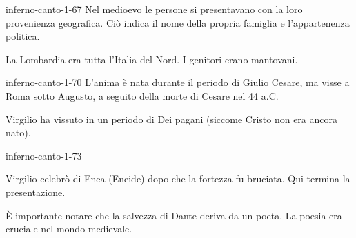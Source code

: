 \documentclass[preview]{standalone}
\begin{document}
\begin{snippet}{inferno-canto-1-67}
    Nel medioevo le persone si presentavano con la loro provenienza geografica.
    Ciò indica il nome della propria famiglia e l'appartenenza politica.
    
    La Lombardia era tutta l'Italia del Nord.
    I genitori erano mantovani.
\end{snippet}

\begin{snippet}{inferno-canto-1-70}
    L'anima è nata durante il periodo di Giulio Cesare, ma visse
    a Roma sotto Augusto, a seguito della morte di Cesare nel 44 a.C.
    
    Virgilio ha vissuto in un periodo di Dei pagani (siccome Cristo non era ancora nato).
\end{snippet}

\begin{snippet}{inferno-canto-1-73}

    Virgilio celebrò di Enea (Eneide) dopo che la fortezza fu bruciata.
    Qui termina la presentazione.
    
    È importante notare che la salvezza di Dante deriva da un poeta.
    La poesia era cruciale nel mondo medievale.
\end{snippet}
\end{document}
